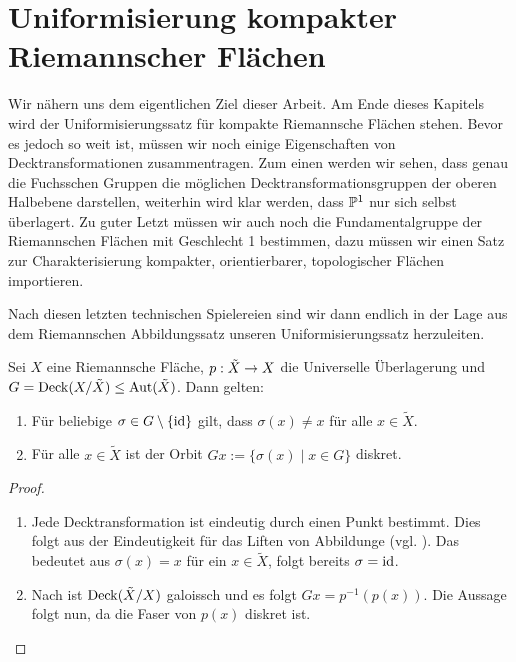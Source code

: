 \section{Uniformisierung kompakter Riemannscher Flächen}
\label{sec:uniformisierung}

Wir nähern uns dem eigentlichen Ziel dieser Arbeit. Am Ende dieses
Kapitels wird der Uniformisierungssatz für kompakte Riemannsche
Flächen stehen. Bevor es jedoch so weit ist, müssen wir noch einige
Eigenschaften von Decktransformationen zusammentragen. Zum einen
werden wir sehen, dass genau die Fuchsschen Gruppen die möglichen
Decktransformationsgruppen der oberen Halbebene darstellen, weiterhin
wird klar werden, dass $\P^1$ nur sich selbst überlagert. Zu guter
Letzt müssen wir auch noch die Fundamentalgruppe der Riemannschen
Flächen mit Geschlecht 1 bestimmen, dazu müssen wir einen Satz zur
Charakterisierung kompakter, orientierbarer, topologischer Flächen
importieren.

Nach diesen letzten technischen Spielereien sind wir dann endlich in
der Lage aus dem Riemannschen Abbildungssatz unseren
Uniformisierungssatz herzuleiten.

\begin{lemma}
  \label{lemma:decktrafo-diskret}
  Sei $X$ eine Riemannsche Fläche, $p: \tilde X \ra X$ die
  Universelle Überlagerung und $G = \Deck(X /\tilde X) \leq
  \Aut(\tilde X)$. Dann gelten:
  \begin{enumerate}
  \item Für beliebige $\sigma \in G \setminus \{\id\}$ gilt, dass $\sigma
    (x) \neq x $ für alle $x \in \tilde X$.
  \item Für alle $x \in \tilde X$ ist der Orbit $Gx := \{ \sigma(x)
    \mid x \in G\}$ diskret.
  \end{enumerate}
\end{lemma}

\begin{proof}
  \begin{enumerate}
  \item Jede Decktransformation ist eindeutig durch einen Punkt
    bestimmt. Dies folgt aus der Eindeutigkeit für das Liften von
    Abbildunge (vgl. \cite[Satz 4.8]{For}). Das bedeutet aus
    $\sigma(x) = x$ für ein $x \in \tilde X$, folgt
    bereits $\sigma = \id$.
  \item Nach \cite[Satz 5.6]{For} ist $\Deck(\tilde X/X)$ galoissch und
    es folgt $Gx = p^{-1}(p(x))$. Die Aussage folgt nun, da die Faser
    von $p(x)$ diskret ist.
  \end{enumerate}
\end{proof}

